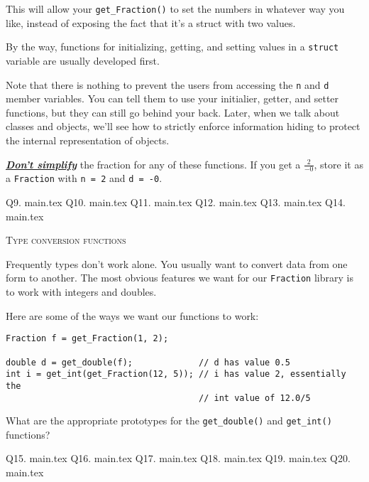 This will allow your \verb!get_Fraction()! to set the numbers in whatever way
you like, instead of exposing the fact that it's a struct with two values.

By the way, functions for initializing, getting, and setting values in a
\verb!struct! variable are usually developed first.

Note that there is nothing to prevent the users from accessing the \verb!n!
and \verb!d! member variables. You can tell them to use your initialier,
getter, and setter functions, but they can still go behind your back. Later,
when we talk about classes and objects, we'll see how to strictly enforce
information hiding to protect the internal representation of objects.

\underline{\textit{\textbf{Don't simplify}}}
the fraction for any of these functions. If you get a
$\frac{2}{-0}$, store it as a \verb!Fraction! with \verb!n = 2! and
\verb!d = -0!.

\newpage Q9. {main.tex}
\newpage Q10. {main.tex}
\newpage Q11. {main.tex}
\newpage Q12. {main.tex}
\newpage Q13. {main.tex}
\newpage Q14. {main.tex}

\newpage
\textsc{Type conversion functions}

Frequently types don't work alone. You usually want to convert data from one
form to another. The most obvious features we want for our \verb!Fraction!
library is to work with integers and doubles.

Here are some of the ways we want our functions to work:
\begin{Verbatim}[frame=single]
Fraction f = get_Fraction(1, 2);

double d = get_double(f);             // d has value 0.5
int i = get_int(get_Fraction(12, 5)); // i has value 2, essentially the 
                                      // int value of 12.0/5
\end{Verbatim}

What are the appropriate prototypes for the \verb!get_double()! and
\verb!get_int()! functions?

\newpage Q15. {main.tex}
\newpage Q16. {main.tex}
\newpage Q17. {main.tex}
\newpage Q18. {main.tex}
\newpage Q19. {main.tex}
\newpage Q20. {main.tex}


